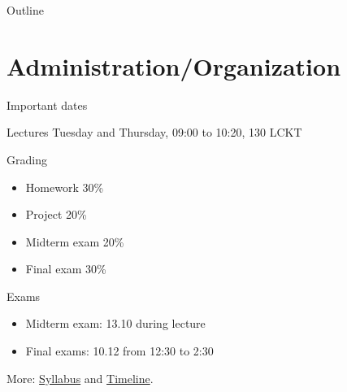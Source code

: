 \documentclass[\classoption]{beamer}
\title{\coursename}
\subtitle{Lecture 1: Introduction and Getting started}
\author{\tiny Patrick Diehl \orcid{0000-0003-3922-8419}}
\date {
 \tiny \url{\courseurl}
\vspace{2cm}
\doclicenseThis  
  
}
\begin{document}
 {
    \frame {
        \titlepage
    }
}

\begin{frame}{Outline}


\tableofcontents

\end{frame}



\section{Administration/Organization}

\begin{frame}{Important dates}
\begin{block}{Lectures}
Tuesday and Thursday, 09:00 to 10:20, 130 LCKT
\end{block}

\begin{block}{Grading}
\begin{itemize}
\item Homework 30\%
\item Project 20\%
\item Midterm exam 20\%
\item  Final exam 30\%
\end{itemize}

\end{block}

\begin{block}{Exams}
\begin{itemize}
\item Midterm exam: 13.10 during lecture
\item Final exams: 10.12 from 12:30 to 2:30
\end{itemize}
\end{block}
\centering
More: \href{\coursesyllabus}{Syllabus} and \href{\coursetimeline}{Timeline}.
\end{frame}
\end{document}
